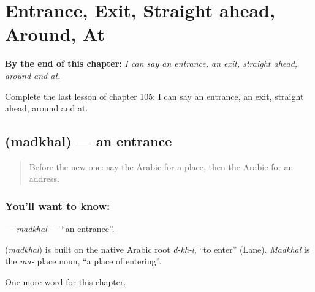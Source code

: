 
\chapter{Entrance, Exit, Straight ahead, Around, At}
\label{ch:ar-entrance-exit-straight-ahead-around-at}

\begin{chapteropening}
\textbf{By the end of this chapter:} \emph{I can say an entrance, an exit, straight ahead, around and at.}

Complete the last lesson of chapter 105: I can say an entrance, an exit, straight ahead, around and at.
\end{chapteropening}

\section[\texorpdfstring{\ar{مدخل} (madkhal)}{مدخل (madkhal)}]{ (madkhal) — an entrance}

\label{lesson:AR-C105-madkhal}



\begin{quote}
Before the new one: say the Arabic for a place, then the Arabic for an address.
\end{quote}

\subsection*{You'll want to know: }
\textbf{} — \emph{madkhal} — \textquotedblleft{}an entrance\textquotedblright{}.

\begin{cousinweb}
\textbf{} (\emph{madkhal}) is built on the native Arabic root \emph{d-kh-l}, \textquotedblleft{}to enter\textquotedblright{} (Lane). \emph{Madkhal} is the \emph{ma-} place noun, \textquotedblleft{}a place of entering\textquotedblright{}.
\end{cousinweb}

\begin{grammarlens}[title={What you've built}]
One more word for this chapter.
\end{grammarlens}

